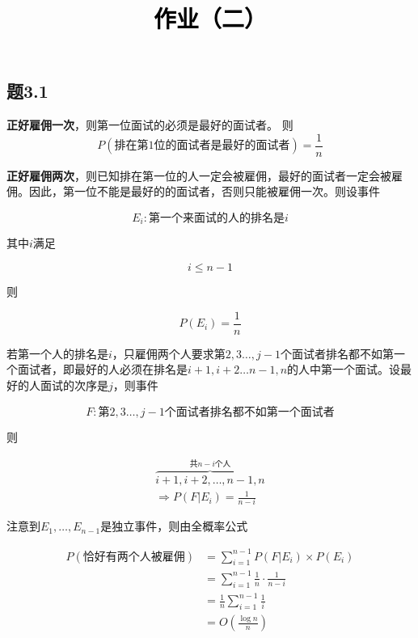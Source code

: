 \documentclass[a4paper,twoside]{article}
\newcommand{\PaperTitle}{作业（二）}  %
\begin{document}
\newpage

\title{
	\Large{\textcolor{black}{\PaperTitle}}
}
	
	
\maketitle
	
\tableofcontents
 
\newpage
\begin{spacing}{1.2}

\section{题3.1}

\textbf{正好雇佣一次}，则第一位面试的必须是最好的面试者。
则
$$
P(\mbox{排在第$1$位的面试者是最好的面试者})=\frac{1}{n}
$$

\textbf{正好雇佣两次}，则已知排在第一位的人一定会被雇佣，最好的面试者一定会被雇佣。因此，第一位不能是最好的的面试者，否则只能被雇佣一次。则设事件

$$
E_i: \mbox{第一个来面试的人的排名是$i$}
$$

其中$i$满足

$$
i \le n-1
$$

则

$$
P(E_i)=\frac{1}{n}
$$

若第一个人的排名是$i$，只雇佣两个人要求第$2, 3 \dots ,j-1$个面试者排名都不如第一个面试者，即最好的人必须在排名是$i+1, i+2 \dots n-1, n$的人中第一个面试。设最好的人面试的次序是$j$，则事件

$$
F: \mbox{第$2, 3 \dots ,j-1$个面试者排名都不如第一个面试者}
$$

则

\begin{align*}
	\overbrace{i+1, i+2, \dots, n-1, n}^{\mbox{共$n-i$个人}} \\
	\Rightarrow P(F|E_i) = \frac{1}{n-i} 
\end{align*}

注意到$E_1, \dots, E_{n-1}$是独立事件，则由全概率公式

\begin{align*}
	P(\mbox{恰好有两个人被雇佣}) &= \sum_{i=1}^{n-1}{P(F|E_i)\times P(E_i)} \\
	&= \sum_{i=1}^{n-1}\frac{1}{n} \cdot \frac{1}{n-i} \\
	&= \frac{1}{n}\sum_{i=1}^{n-1}\frac{1}{i} \\
	&= O(\frac{\log n}{n})
\end{align*}


\end{spacing}
\end{document}
